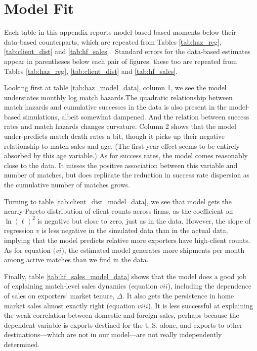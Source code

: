 \documentclass[12pt]{article}
\begin{document}
\section{Model Fit}

\label{sec:model_fit}

Each table in this appendix reports model-based based moments below their
data-based counterparts, which are repeated from Tables \ref{tab:haz_reg}, %
\ref{tab:client_dist} and \ref{tab:hf_sales}.\textbf{\ }Standard errors for
the data-based estimates appear in parentheses below each pair of figures;
these too are repeated from Tables \ref{tab:haz_reg}, \ref{tab:client_dist}
and \ref{tab:hf_sales}.

Looking first at table \ref{tab:haz_model_data}, column 1, we see the model
understates monthly log match hazards.The quadratic relationship between
match hazards and cumulative successes in the data is also present in the
model-based simulations, albeit somewhat dampened. And the relation between
success rates and match hazards changes curvature. Column 2 shows that the
model under-predicts match death rates a bit, though it picks up their
negative relationship to match sales and age. (The first year effect seems
to be entirely absorbed by this age variable.) As for success rates, the
model comes reasonably close to the data. It misses the positive association
between this variable and number of matches, but does replicate the
reduction in success rate dispersion as the cumulative number of matches
grows.

Turning to table \ref{tab:client_dist_model_data}, we see that model gets
the nearly-Pareto distribution of client counts across firms, as the
coefficient on $\ln (\ell )^{2}$ is negative but close to zero, just as in
the data. However, the slope of regression $v$ is less negative in the
simulated data than in the actual data, implying that the model predicts
relative more exporters have high-client counts. As for equation $(vi$), the
estimated model generates more shipments per month among active matches than
we find in the data.

Finally, table \ref{tab:hf_sales_model_data} shows that the model does a
good job of explaining match-level sales dynamics (equation $vii$),
including the dependence of sales on exporters' market tenure, $\Delta $. It
also gets the persistence in home market sales almost exactly right
(equation $viii$). It is less successful at explaining the weak correlation
between domestic and foreign sales, perhaps because the dependent variable
is exports destined for the U.S. alone, and exports to other
destinations---which are not in our model---are not really independently
determined.\pagebreak
\end{document}
